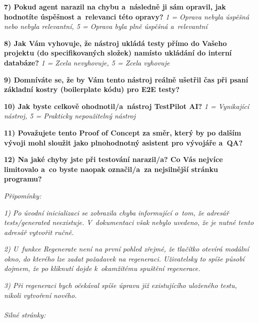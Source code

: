 \documentclass[czech, ing, kiv, he, iso690numb, viewonly]{fasthesis}
\begin{document}
\begin{tcolorbox}[breakable, colback=gray!3, colframe=black!35, boxrule=0.4pt, arc=2pt, title={Google Forms - export odpovědi}]
\textbf{7) Pokud agent narazil na chybu a~následně ji sám opravil, jak hodnotíte úspěšnost a~relevanci této opravy?}
\textit{1 = Oprava nebyla úspěšná nebo nebyla relevantní, 5 = Oprava byla plně úspěšná a~relevantní}

 \quad {} \quad {} \quad {} \quad {}

\textbf{8) Jak Vám vyhovuje, že nástroj ukládá testy přímo do Vašeho projektu (do specifikovaných složek) namísto ukládání do interní databáze?}
\textit{1 = Zcela nevyhovuje, 5 = Zcela vyhovuje}

 \quad {} \quad {} \quad {} \quad {}

\textbf{9) Domníváte se, že by Vám tento nástroj reálně ušetřil čas při psaní základní kostry (boilerplate kódu) pro E2E testy?}

 \quad {} \quad {} \quad {}

\textbf{10) Jak byste celkově ohodnotil/a~nástroj TestPilot AI?}
\textit{1 = Vynikající nástroj, 5 = Prakticky nepoužitelný nástroj}

 \quad {} \quad {} \quad {} \quad {}

\textbf{11) Považujete tento Proof of Concept za směr, který by po dalším vývoji mohl sloužit jako plnohodnotný asistent pro vývojáře a~QA?}

 \quad {} \quad {} \quad {}

\textbf{12) Na jaké chyby jste při testování narazil/a? Co Vás nejvíce limitovalo a~co byste naopak označil/a~za nejsilnější stránku programu?}

\textit{Připomínky:}

\textit{1) Po úvodní inicializaci se zobrazila chyba informující o~tom, že adresář tests/generated neexistuje. V~dokumentaci však nebylo uvedeno, že je nutné tento adresář vytvořit ručně.}

\textit{2) U~funkce Regenerate není na první pohled zřejmé, že tlačítko otevírá modální okno, do kterého lze zadat požadavek na regeneraci. Uživatelsky to spíše působí dojmem, že po kliknutí dojde k~okamžitému spuštění regenerace.}

\textit{3) Při regeneraci bych očekával spíše úpravu již existujícího uloženého testu, nikoli vytvoření nového.}
\\\\
\textit{Silné stránky:}


\end{tcolorbox}
\end{document}
